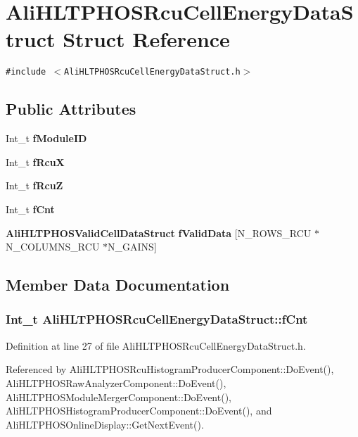 \section{Ali\-HLTPHOSRcu\-Cell\-Energy\-Data\-Struct Struct Reference}
\label{structAliHLTPHOSRcuCellEnergyDataStruct}
{\tt \#include $<$Ali\-HLTPHOSRcu\-Cell\-Energy\-Data\-Struct.h$>$}

\subsection*{Public Attributes}
\begin{CompactItemize}
\item 
Int\_\-t {\bf f\-Module\-ID}
\item 
Int\_\-t {\bf f\-Rcu\-X}
\item 
Int\_\-t {\bf f\-Rcu\-Z}
\item 
Int\_\-t {\bf f\-Cnt}
\item 
{\bf Ali\-HLTPHOSValid\-Cell\-Data\-Struct} {\bf f\-Valid\-Data} [N\_\-ROWS\_\-RCU $\ast$N\_\-COLUMNS\_\-RCU $\ast$N\_\-GAINS]
\end{CompactItemize}


\subsection{Member Data Documentation}
\subsubsection{\setlength{\rightskip}{0pt plus 5cm}Int\_\-t {\bf Ali\-HLTPHOSRcu\-Cell\-Energy\-Data\-Struct::f\-Cnt}}\label{structAliHLTPHOSRcuCellEnergyDataStruct_o3}




Definition at line 27 of file Ali\-HLTPHOSRcu\-Cell\-Energy\-Data\-Struct.h.

Referenced by Ali\-HLTPHOSRcu\-Histogram\-Producer\-Component::Do\-Event(), Ali\-HLTPHOSRaw\-Analyzer\-Component::Do\-Event(), Ali\-HLTPHOSModule\-Merger\-Component::Do\-Event(), Ali\-HLTPHOSHistogram\-Producer\-Component::Do\-Event(), and Ali\-HLTPHOSOnline\-Display::Get\-Next\-Event().
